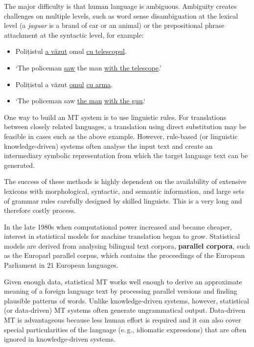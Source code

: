 \begin{multicols}{2}
The major difficulty is that human language is ambiguous. Ambiguity creates challenges on multiple levels, such as word sense disambiguation at the lexical level (a \textit{jaguar} is a brand of car or an animal) or the prepositional phrase attachment at the syntactic level, for example:

\begin{example}
\begin{itemize}
\item []Polițistul \underline{a văzut} omul \underline{cu telescopul}.
\item []`The policeman \underline{saw} the man \underline{with the telescope}.'
\end{itemize}
\end{example}

\begin{example}
\begin{itemize}
\item []Polițistul a văzut \underline{omul} \underline{cu arma}.
\item []`The policeman saw \underline{the man} \underline{with the gun}.`
\end{itemize}
\end{example}

One way to build an MT system is to use linguistic rules. For translations between closely related languages, a translation using direct substitution may be feasible in cases such as the above example. However, rule-based (or linguistic knowledge-driven) systems often analyse the input text and create an intermediary symbolic representation from which the target language text can be generated. 

The success of these methods is highly dependent on the availability of extensive lexicons with morphological, syntactic, and semantic information, and large sets of grammar rules carefully designed by skilled linguists. This is a very long and therefore costly process. 

In the late 1980s when computational power increased and became cheaper, interest in statistical models for machine translation began to grow. Statistical models are derived from analysing bilingual text corpora, \textbf{parallel corpora}, such as the Europarl parallel corpus, which contains the proceedings of the European Parliament in 21 European languages. 

Given enough data, statistical MT works well enough to derive an approximate meaning of a foreign language text by processing parallel versions and finding plausible patterns of words. Unlike knowledge-driven systems, however, statistical (or data-driven) MT systems often generate ungrammatical output. Data-driven MT is advantageous because less human effort is required and it can also cover special particularities of the language (e.\,g., idiomatic expressions) that are often ignored in knowledge-driven systems. 


\end{multicols}
